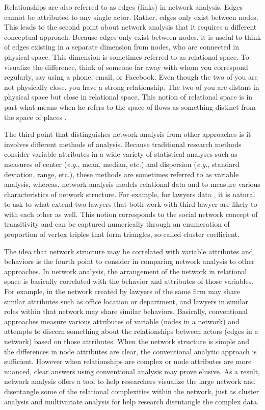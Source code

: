Relationships are also referred to as edges (links) in network analysis. Edges cannot be attributed to any single actor. Rather, edges only exist between nodes. This leads to the second point about network analysis that it requires a different conceptual approach. Because edges only exist between nodes, it is useful to think of edges existing in a separate dimension from nodes, who are connected in physical space. This dimension is sometimes referred to as relational space. To visualize the difference, think of someone far away with whom you correspond regularly, say using a phone, email, or Facebook. Even though the two of you are not physically close, you have a strong relationship. The two of you are distant in physical space but close in relational space. This notion of relational space is in part what means when he refers to the space of flows as something distinct from the space of places \citep{Castells}.

The third point that distinguishes network analysis from other approaches is it involves different methods of analysis. Because traditional research methods consider variable attributes in a wide variety of statistical analyses such as measures of center (\textit{e.g.}, mean, median, etc.) and dispersion (\textit{e.g.}, standard deviation, range, etc.), these methods are sometimes referred to as variable analysis, whereas, network analysis models relational data and to measure various characteristics of network structure. For example, for lawyers data \citep{Lazega}, it is natural to ask to what extend two lawyers that both work with third lawyer are likely to with each other as well. This notion corresponds to the social network concept of transitivity and can be captured numerically through an enumeration of proportion of vertex triples that form triangles, so-called cluster coefficient. 

The idea that network structure may be correlated with variable attributes and behaviors is the fourth point to consider in comparing network analysis to other approaches. In network analysis, the arrangement of the network in relational space is basically correlated with the behavior and attributes of those variables. For example, in the network created by \citet{Lazega} lawyers of the same firm may share similar attributes such as office location or department, and lawyers in similar roles within that network may share similar behaviors. Basically, conventional approaches measure various attributes of variable (nodes in a network) and attempts to discern something about the relationships between actors (edges in a network) based on those attributes. When the network structure is simple and the differences in node attributes are clear, the conventional analytic approach is sufficient. However when relationships are complex or node attributes are more nuanced, clear answers using conventional analysis may prove elusive. As a result, network analysis offers a tool to help researchers visualize the large network and disentangle some of the relational complexities within the network, just as cluster analysis and multivariate analysis for help research disentangle the complex data.

